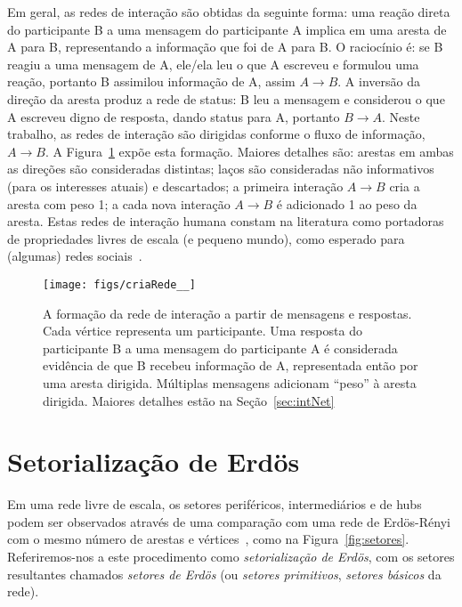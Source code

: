 \documentclass[a4paper,openright,12pt]{report} %
\begin{document}
Em geral, as redes de interação são obtidas da seguinte forma:
uma reação direta do participante B a uma mensagem do participante A implica em uma aresta de A para B,
representando a informação que foi de A para B.
O raciocínio é: se B reagiu
a uma mensagem de A, ele/ela leu o que A escreveu e formulou uma reação, portanto B
assimilou informação de A, assim $A \rightarrow B$.
A inversão da direção da aresta produz a rede de status: B leu a mensagem e considerou
o que A escreveu digno de resposta, dando status para A, portanto $B \rightarrow A$.
Neste trabalho, as redes de interação são dirigidas conforme o fluxo de informação, $A \rightarrow B$.
A Figura~\ref{formationNetwork} expõe esta formação. Maiores detalhes são:
arestas em ambas as direções são consideradas distintas;
laços são consideradas não informativos (para os interesses atuais) e descartados;  
a primeira interação $A\rightarrow B$ cria a aresta com peso 1; 
a cada nova interação $A\rightarrow B$ é adicionado 1 ao peso da aresta.
Estas redes de interação humana constam na literatura como portadoras
de propriedades livres de escala (e pequeno mundo), como esperado
para (algumas) redes sociais~\cite{bird,newmanBook}.

\begin{figure}[!h]
    \centering
    \caption{ \footnotesize A formação da rede de interação a partir
        de mensagens e respostas.
        Cada vértice representa um participante.
        Uma resposta do participante B a uma
        mensagem do participante A é considerada
        evidência de que B recebeu informação de A,
        representada então por uma aresta dirigida.
        Múltiplas mensagens adicionam ``peso'' à
        aresta dirigida. Maiores detalhes
        estão na Seção~\ref{sec:intNet}}
    \texttt{[image: figs/criaRede\_\_]}
    \label{formationNetwork}
\end{figure}

\section{Setorialização de Erdös}\label{sec:sec}
Em uma rede livre de escala, os setores periféricos, intermediários
e de hubs podem ser observados através de uma comparação
com uma rede de Erdös-Rényi com o mesmo número de arestas e vértices~\cite{3setores},
como na Figura~\ref{fig:setores}.
Referiremos-nos a este procedimento como \emph{setorialização de Erdös},
com os setores resultantes chamados \emph{setores de Erdös}
(ou \emph{setores primitivos}, \emph{setores básicos} da rede).
\end{document}
